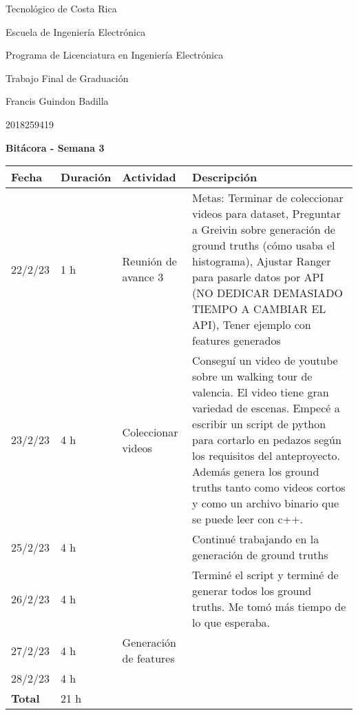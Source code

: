 \documentclass[12pt,oneside]{book}
\begin{document}
 \graphicspath{{./}{../tesis/fig/}}
  Tecnológico de Costa Rica
  \par\vspace{1mm}
  Escuela de Ingeniería Electrónica
  \par\vspace{1mm}
  Programa de Licenciatura en Ingeniería Electrónica
  \par\vspace{10mm}
  Trabajo Final de Graduación
  \par\vspace{1mm}
  Francis Guindon Badilla
  \par\vspace{1mm}
  2018259419
  \par\vspace{10mm}
  \large\textbf{Bitácora - Semana 3}
  \par\vspace{10mm}
  \small

  \begin{table} [!h]
    \centering
    \small
    \begin{tabular}{p{1.5 cm} p{2.1 cm} p{5 cm} p{8 cm}}
      \hline
      Fecha & Duración & Actividad & Descripción \\
      \hline
      22/2/23 & 1 h & Reunión de avance 3 & Metas: Terminar de coleccionar videos para dataset, Preguntar a Greivin sobre generación de ground truths (cómo usaba el histograma), Ajustar Ranger para pasarle datos por API (NO DEDICAR DEMASIADO TIEMPO A CAMBIAR EL API), Tener ejemplo con features generados \\
      23/2/23 & 4 h & Coleccionar videos & Conseguí un video de youtube sobre un walking tour de valencia. El video tiene gran variedad de escenas. Empecé a escribir un script de python para cortarlo en pedazos según los requisitos del anteproyecto. Además genera los ground truths tanto como videos cortos y como un archivo binario que se puede leer con c++. \\
      25/2/23 & 4 h & & Continué trabajando en la generación de ground truths \\
      26/2/23 & 4 h & & Terminé el script y terminé de generar todos los ground truths. Me tomó más tiempo de lo que esperaba. \\
      27/2/23 & 4 h & Generación de features & \\
      28/2/23 & 4 h & & \\
      \hline
      \textbf{Total} & 21 h \\
      \hline
    \end{tabular}
  \end{table}
  
\end{document}
